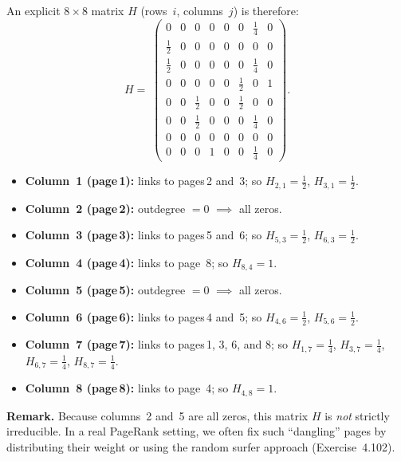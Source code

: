 \documentclass{article}
\begin{document}
An explicit $8\times 8$ matrix $H$ (rows~$i$, columns~$j$) is therefore:
\[
H 
=\;
\begin{pmatrix}
0      & 0    & 0      & 0    & 0    & 0      & \tfrac{1}{4} & 0 \\
\tfrac{1}{2} & 0    & 0      & 0    & 0    & 0      & 0          & 0 \\
\tfrac{1}{2} & 0    & 0      & 0    & 0    & 0      & \tfrac{1}{4} & 0 \\
0      & 0    & 0      & 0    & 0    & \tfrac{1}{2} & 0          & 1 \\
0      & 0    & \tfrac{1}{2} & 0    & 0    & \tfrac{1}{2} & 0          & 0 \\
0      & 0    & \tfrac{1}{2} & 0    & 0    & 0      & \tfrac{1}{4} & 0 \\
0      & 0    & 0      & 0    & 0    & 0      & 0          & 0 \\
0      & 0    & 0      & 1    & 0    & 0      & \tfrac{1}{4} & 0 
\end{pmatrix}.
\]
\begin{itemize}
  \item \textbf{Column~1 (page\,1):} links to pages\,2 and~3; so $H_{2,1} = \tfrac12$, $H_{3,1} = \tfrac12$.
  \item \textbf{Column~2 (page\,2):} outdegree $=0$ $\implies$ all zeros.
  \item \textbf{Column~3 (page\,3):} links to pages\,5 and~6; so $H_{5,3} = \tfrac12$, $H_{6,3} = \tfrac12$.
  \item \textbf{Column~4 (page\,4):} links to page~8; so $H_{8,4} = 1$.
  \item \textbf{Column~5 (page\,5):} outdegree $=0$ $\implies$ all zeros.
  \item \textbf{Column~6 (page\,6):} links to pages\,4 and~5; so $H_{4,6} = \tfrac12$, $H_{5,6} = \tfrac12$.
  \item \textbf{Column~7 (page\,7):} links to pages\,1, 3, 6, and 8; so $H_{1,7} = \tfrac14$, $H_{3,7} = \tfrac14$, $H_{6,7} = \tfrac14$, $H_{8,7} = \tfrac14$.
  \item \textbf{Column~8 (page\,8):} links to page~4; so $H_{4,8} = 1$.
\end{itemize}

\noindent
\textbf{Remark.} Because columns~2 and~5 are all zeros, this matrix $H$ is \emph{not} strictly irreducible. 
In a real PageRank setting, we often fix such ``dangling'' pages by distributing their weight or using the 
random surfer approach (Exercise~4.102).
\end{document}
